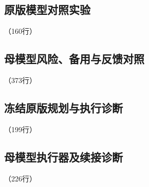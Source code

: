 
\label{code:source:11:end}


\subsection{原版模型对照实验}

\label{code:source:12}

{\small\noindent{}\quad（160行）\par}


\label{code:source:12:end}


\subsection{母模型风险、备用与反馈对照}

\label{code:source:13}

{\small\noindent{}\quad（373行）\par}


\label{code:source:13:end}


\subsection{冻结原版规划与执行诊断}

\label{code:source:14}

{\small\noindent{}\quad（199行）\par}


\label{code:source:14:end}


\subsection{母模型执行器及续接诊断}

\label{code:source:15}

{\small\noindent{}\quad（226行）\par}

